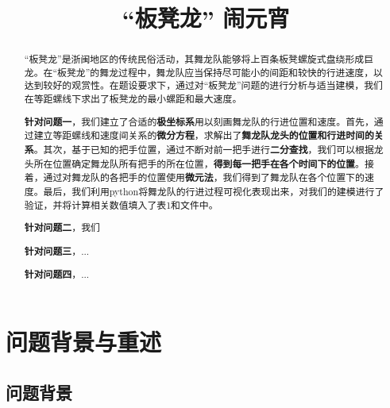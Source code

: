 \documentclass[a4paper]{article}
\title{“板凳龙” 闹元宵}
\date{} %
\begin{document}
	\maketitle
	\vspace{-6em} %
	\begin{abstract}
		“板凳龙”是浙闽地区的传统民俗活动，其舞龙队能够将上百条板凳螺旋式盘绕形成巨龙。在“板凳龙”的舞龙过程中，舞龙队应当保持尽可能小的间距和较快的行进速度，以达到较好的观赏性。在题设要求下，通过对“板凳龙”问题的进行分析与适当建模，我们在等距螺线下求出了板凳龙的最小螺距和最大速度。
		
		\hspace{0.2em}\textbf{针对问题一}，我们建立了合适的\textbf{极坐标系}用以刻画舞龙队的行进位置和速度。首先，通过建立等距螺线和速度间关系的\textbf{微分方程}，求解出了\textbf{舞龙队龙头的位置和行进时间的关系}。其次，基于已知的把手位置，通过不断对前一把手进行\textbf{二分查找}，我们可以根据龙头所在位置确定舞龙队所有把手的所在位置，\textbf{得到每一把手在各个时间下的位置}。接着，通过对舞龙队的各把手的位置使用\textbf{微元法}，我们得到了舞龙队在各个位置下的速度。最后，我们利用python将舞龙队的行进过程可视化表现出来，对我们的建模进行了验证，并将计算相关数值填入了表1和文件中。
		
		\textbf{针对问题二}，我们
		
		\textbf{针对问题三}，...
		
		\textbf{针对问题四}，...\\
		\newline
	\end{abstract}
	
	\clearpage %
	
	\section{问题背景与重述}
	\subsection{问题背景}
	
	
\end{document}

